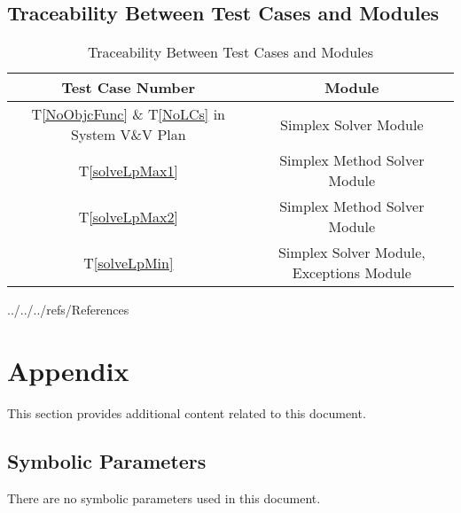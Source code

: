 \documentclass[12pt, titlepage]{article}
\newcommand{\tref}[1]{T\ref{#1}}
\begin{document}
\subsection{Traceability Between Test Cases and Modules}

\begin{table} [h!]
	\centering
	\begin{tabular}{|c|c|}
		\hline	
		\textbf{Test Case Number} & \textbf{Module}\\
		\hline 
		T\ref{NoObjcFunc} \& T\ref{NoLCs} in System V\&V Plan& Simplex Solver 
		Module\\ \hline
		\tref{solveLpMax1}& Simplex Method Solver Module\\ \hline
		\tref{solveLpMax2}& Simplex Method Solver Module\\ \hline
		\tref{solveLpMin}& Simplex Solver Module, Exceptions Module\\ \hline
	\end{tabular}
	\caption{Traceability Between Test Cases and Modules}
	\label{Table:Traceability} 
\end{table}


\newpage


 {../../../refs/References}

\newpage

\section{Appendix}

This section provides additional content related to this document.

\subsection{Symbolic Parameters}

There are no symbolic parameters used in this document.
\end{document}
